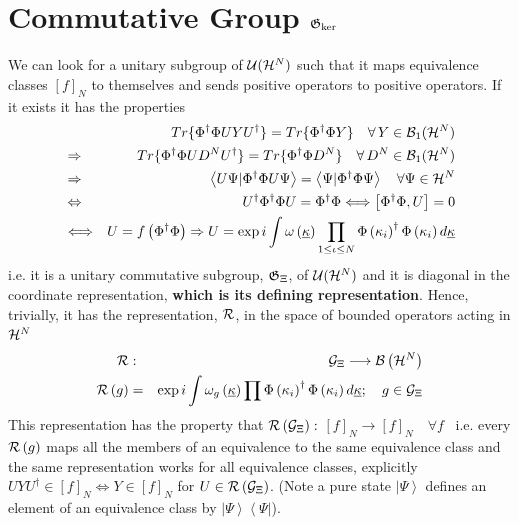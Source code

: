                       

\section{Commutative Group ${\frak G}_{\ker }$\protect\bigskip }

We can look for a unitary subgroup of ${\cal U}({\cal H}^{N})$ such that it
maps equivalence classes $\left[ f\right] _{N}$ to themselves and sends
positive operators to positive operators. If it exists it has the properties%
\begin{eqnarray}
&&Tr\{\Phi ^{\dagger }\Phi UYU^{\dagger }\}=Tr\{\Phi ^{\dagger }\Phi
Y\}\quad \forall \,Y\in {\cal B}_{1}({\cal H}^{N})  \nonumber \\
&\Rightarrow &Tr\{\Phi ^{\dagger }\Phi UD^{N}U^{\dagger }\}=Tr\{\Phi
^{\dagger }\Phi D^{N}\}\quad \forall \,D^{N}\in {\cal B}_{1}({\cal H}^{N}) 
\nonumber \\
&\Rightarrow &\left\langle U\Psi |\Phi ^{\dagger }\Phi U\Psi \right\rangle
=\left\langle \Psi |\Phi ^{\dagger }\Phi \Psi \right\rangle \quad \forall
\Psi \in {\cal H}^{N}  \nonumber \\
&\Leftrightarrow &U^{\dagger }\Phi ^{\dagger }\Phi U=\Phi ^{\dagger }\Phi
\Longleftrightarrow \left[ \Phi ^{\dagger }\Phi ,U\right] =0  \nonumber \\
&\Longleftrightarrow &U=f\left( \Phi ^{\dagger }\Phi \right) \Rightarrow
U=\exp i\int \omega \left( \underline{\kappa }\right) \prod_{1\leq \iota
\leq N}\Phi \left( \kappa _{i}\right) ^{\dagger }\Phi \left( \kappa
_{i}\right) d\underline{\kappa }
\end{eqnarray}%
i.e. it is a unitary commutative subgroup, ${\frak G}_{\Xi }$, of ${\cal U}(%
{\cal H}^{N})$ and it is diagonal in the coordinate representation, {\bf %
which is its defining representation}. Hence, trivially, it has the
representation, ${\cal R}$, in the space of bounded operators acting in $%
{\cal H}^{N}$%
\begin{eqnarray}
{\cal R} &:&{\cal G}_{\Xi }\longrightarrow {\cal B}\left( {\cal H}^{N}\right)
\nonumber \\
{\cal R}\left( g\right) &=&\exp i\int \omega _{g}\left( \underline{\kappa }%
\right) \prod \Phi \left( \kappa _{i}\right) ^{\dagger }\Phi \left( \kappa
_{i}\right) d\underline{\kappa };\quad g\in {\cal G}_{\Xi }  \label{unitary}
\end{eqnarray}%
This representation has the property that ${\cal R}\left( {\cal G}_{\Xi
}\right) :$ $\left[ f\right] _{N}\longrightarrow \left[ f\right] _{N}\quad
\forall f$ \ i.e. every ${\cal R}\left( g\right) $ maps all the members of
an equivalence to the same equivalence class and the same representation
works for all equivalence classes, explicitly $UYU^{\dagger }\in \left[ f%
\right] _{N}\Longleftrightarrow Y\in \left[ f\right] _{N}$ for $U\in {\cal R}%
\left( {\cal G}_{\Xi }\right) $. (Note a pure state $\left| \Psi
\right\rangle $ defines an element of an equivalence class by $\left| \Psi
\right\rangle \left\langle \Psi \right| $).

